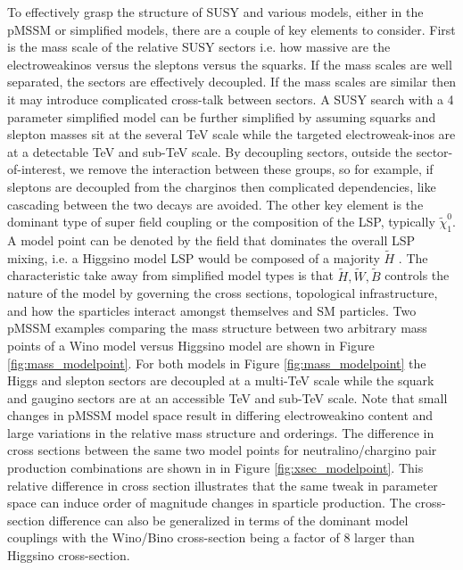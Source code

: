To effectively grasp the structure of SUSY and various models, either in the pMSSM or simplified models, there are a couple of key elements to consider. First is the mass scale of the relative SUSY sectors i.e. how massive are the electroweakinos versus the sleptons versus the squarks. If the mass scales are well separated, the sectors are effectively decoupled. If the mass scales are similar then it may introduce complicated cross-talk between sectors. A SUSY search with a 4 parameter simplified model can be further simplified by assuming squarks and slepton masses sit at the several TeV scale while the targeted electroweak-inos are at a detectable TeV and sub-TeV scale.  By decoupling sectors, outside the sector-of-interest, we remove the interaction between these groups, so for example, if sleptons are decoupled from the charginos then complicated dependencies, like cascading between the two decays are avoided. The other key element is the dominant type of super field coupling or the composition of the LSP, typically $\tilde{\chi}^0_1$.  A model point can be denoted by the field that dominates the overall LSP mixing, i.e. a Higgsino model LSP would be composed of a majority $\tilde{H}$ \cite{ATLAS:2015wrn}. The characteristic take away from simplified model types is that $\tilde{H},\tilde{W},\tilde{B}$ controls the nature of the model by governing the cross sections, topological infrastructure, and how the sparticles interact amongst themselves and SM particles. Two pMSSM examples comparing the mass structure between two arbitrary mass points of a Wino model versus Higgsino model are shown in Figure \ref{fig:mass_modelpoint}. For both models in Figure \ref{fig:mass_modelpoint} the Higgs and slepton sectors are decoupled at a multi-TeV scale while the squark and gaugino sectors are at an accessible TeV and sub-TeV scale. Note that small changes in pMSSM model space result in differing electroweakino content and large variations in the relative mass structure and orderings. The difference in cross sections between the same two model points for neutralino/chargino pair production combinations are shown in in Figure \ref{fig:xsec_modelpoint}. This relative difference in cross section illustrates that the same tweak in parameter space can induce order of magnitude changes in sparticle production. The cross-section difference can also be generalized in terms of the dominant model couplings with the Wino/Bino cross-section being a factor of 8 larger than Higgsino cross-section.



